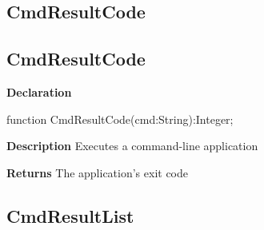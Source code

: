 \documentclass{report}
\newif\ifpdf
\begin{document}
\subsection*{\large{\textbf{CmdResultCode}}\normalsize\hspace{1ex}\hrulefill}
\else
\subsection*{CmdResultCode}
\fi
\label{utilities-CmdResultCode}
\begin{list}{}{
\setlength{\itemindent}{0cm}
\setlength{\listparindent}{0cm}
\setlength{\leftmargin}{\evensidemargin}
\addtolength{\leftmargin}{\tmplength}
\settowidth{\labelsep}{X}
\addtolength{\leftmargin}{\labelsep}
\setlength{\labelwidth}{\tmplength}
}
\item[\textbf{Declaration}\hfill]
\ifpdf
\begin{flushleft}
\fi
\begin{ttfamily}
function CmdResultCode(cmd:String):Integer;\end{ttfamily}

\ifpdf
\end{flushleft}
\fi

\par
\item[\textbf{Description}]
Executes a command{-}line application \par
\item[\textbf{Returns}]The application's exit code


\end{list}
\ifpdf
\subsection*{\large{\textbf{CmdResultList}}\normalsize\hspace{1ex}\hrulefill}
\else
\end{document}
